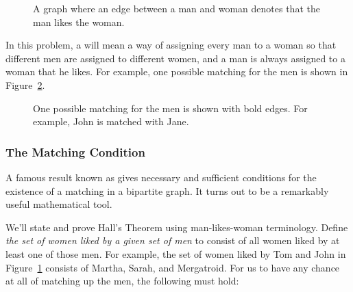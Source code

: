 \begin{figure}



\caption{A graph where an edge between a man and woman denotes that
  the man likes the woman.}

\label{fig:5J}

\end{figure}

In this problem, a  will mean a way of assigning every
man to a woman so that different men are assigned to different women,
and a man is always assigned to a woman that he likes.  For example,
one possible matching for the men is shown in Figure~\ref{fig:5K}.

\begin{figure}



\caption{One possible matching for the men is shown with bold edges.
  For example, John is matched with Jane.}

\label{fig:5K}

\end{figure}

\subsubsection{The Matching Condition}

A famous result known as  gives necessary
and sufficient conditions for the existence of a matching in a
bipartite graph.  It turns out to be a remarkably useful mathematical
tool.

We'll state and prove Hall's Theorem using man-likes-woman
terminology.  Define \emph{the set of women liked by a given set of
  men} to consist of all women liked by at least one of those men.
For example, the set of women liked by Tom and John in
Figure~\ref{fig:5J} consists of Martha, Sarah, and Mergatroid.  For us
to have any chance at all of matching up the men, the following
 must hold:

\medskip

\noindent{}

